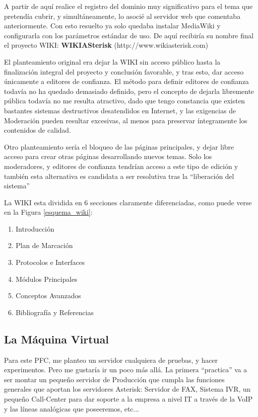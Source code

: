 A partir de aquí realice el registro del dominio muy significativo para el tema que pretendía cubrir, y simultáneamente, lo asocié al servidor web que comentaba anteriormente. Con esto resuelto ya solo quedaba instalar MediaWiki y configurarla con los parámetros estándar de uso. De aquí recibiría su nombre final el proyecto WIKI: \textbf{WIKIASterisk} (http://www.wikiasterisk.com) 

El planteamiento original era dejar la WIKI sin acceso público hasta la finalización integral del proyecto y conclusión favorable, y tras esto, dar acceso únicamente a editores de confianza. El método para definir editores de confianza todavía no ha quedado demasiado definido, pero el concepto de dejarla libremente pública todavía no me resulta atractivo, dado que tengo constancia que existen bastantes sistemas destructivos desatendidos en Internet, y las exigencias de Moderación pueden resultar excesivas, al menos para preservar íntegramente los contenidos de calidad.

Otro planteamiento sería el bloqueo de las páginas principales, y dejar libre acceso para crear otras páginas desarrollando nuevos temas. Solo los moderadores, y editores de confianza tendrían acceso a este tipo de edición y también esta alternativa es candidata a ser resolutiva tras la ``liberación del sistema''

La WIKI esta dividida en 6 secciones claramente diferenciadas, como puede verse en la Figura \ref{esquema_wiki}:

\begin{enumerate}
	\item Introducción
	\item Plan de Marcación
	\item Protocolos e Interfaces
	\item Módulos Principales
	\item Conceptos Avanzados
	\item Bibliografía y Referencias
\end{enumerate}


\subsection{La Máquina Virtual}

Para este PFC, me planteo un servidor cualquiera de pruebas, y hacer experimentos. Pero me gustaría ir un poco más allá. La primera ``practica'' va a ser montar un pequeño servidor de Producción que cumpla las funciones generales que aportan los servidores Asterisk: Servidor de FAX, Sistema IVR, un pequeño Call-Center para dar soporte a la empresa a nivel IT a través de la VoIP y las líneas analógicas que poseeremos, etc...

